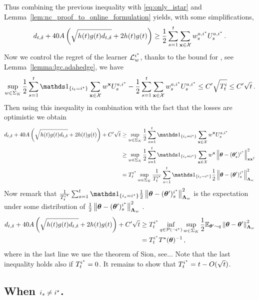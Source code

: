 Thus combining the previous inequality with \eqref{eq:only_istar} and Lemma~\ref{lem:nc_proof_to_online_formulation} yields, with some simplifications,
\begin{equation}
\label{eq:to_UCB}
d_{t,\delta} + 40 A\left(\sqrt{h(t)g(t) d_{t,\delta}}+ 2h(t)g(t)\right) \geq \frac{1}{2}\sum_{s=1}^t\sum_{{\bf x}\in\mathcal{X}} w_s^{a,i^\star}U_s^{a,i^\star}\,.
\end{equation}
Now we control the regret of the learner $\mathcal{L}_w^{i^\star}$, thanks to the bound for \AH, see Lemma~\ref{lemma:lgc.adahedge}, we have
\[
\sup_{w\in\Sigma_K}\frac{1}{2}\sum_{s=1}^t\ind_{\{i_t = \istar\}}\sum_{\bx\in\cX} w^{\bx}U_s^{a,\istar} -\frac{1}{2}\sum_{s=1}^t\sum_{\bx\in\cX} w_s^{a,\istar}U_s^{a,\istar} \leq C'\sqrt{T_t^i}\leq C'\sqrt{t}\,.
\]
Then using this inequality in combination with the fact that the losses are optimistic we obtain
\begin{align*}
  d_{t,\delta} + 40 A\left(\sqrt{h(t)g(t) d_{t,\delta}}+ 2h(t)g(t)\right) +C'\sqrt{t}
  &\geq \sup_{w\in\Sigma_K}\frac{1}{2}\sum_{s=1}^t\ind_{\{i_s = \istar\}}\sum_{\bx\in\cX} w^{\bx}U_s^{a,\istar}
  \\
  &\geq \sup_{w\in\Sigma_K}\frac{1}{2}\sum_{s=1}^t\ind_{\{i_s = \istar\}}\sum_{\bx\in\cX} w^{\bx} \normm{\btheta -(\btheta'_s)^{\istar}}^2_{\bx\bx\transpose}
  \\
  &= T^{\istar}_t \sup_{w\in\Sigma_K}\frac{1}{T^{i^*}_t}\sum_{s=1}^t\ind_{\{i_s = \istar\}}\frac{1}{2}\normm{\btheta -(\btheta')_s^{\istar}}^2_{\bLambda_{w}}
  \end{align*}
Now remark that $\frac{1}{T^{i^\star}_t}\sum_{s=1}^t\ind_{\{i_s = \istar\}}\frac{1}{2}\normm{\btheta -(\btheta')_s^{\istar}}^2_{\bLambda_{w}}$ is the expectation under some distribution of $\frac{1}{2}\left\lVert{\boldsymbol \theta} -({\boldsymbol \theta}')_s^{i^\star}\right\rVert^2_{{\boldsymbol \Lambda}_{w}}$ .
\begin{align*}
  d_{t,\delta} + 40 A\left(\sqrt{h(t)g(t) d_{t,\delta}}+ 2h(t)g(t)\right) +C'\sqrt{t}
  &\geq T^{i^\star}_t \inf_{q\in\mathcal{P}(\neg i^\star)} \sup_{w\in\Sigma_K}\frac{1}{2}\mathbb{E}_{{\boldsymbol \theta}'\sim q}\left\lVert{\boldsymbol \theta} -{\boldsymbol \theta}'\right\rVert^2_{{\boldsymbol \Lambda}_{w}}\\
 &=T^{i^\star}_t T^{\star}({\boldsymbol \theta})^{-1}\,,
\end{align*}
where in the last line we use the theorem of Sion, see...%
Note that the last inequality holds also if $T_t^{i^\star} = 0$. It remains to show that $T^{i^\star}_t = t- O(\sqrt{t})$.

\subsection{When $i_s \neq i^\star$.}

